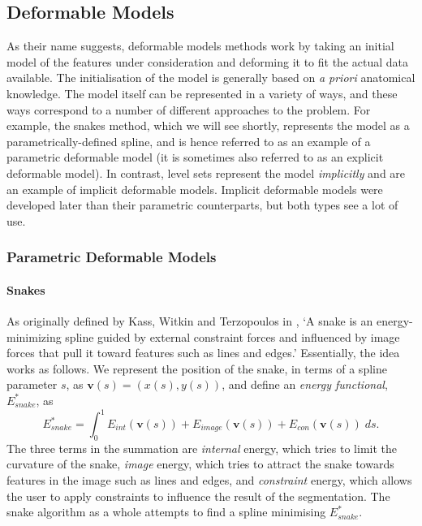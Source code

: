 \subsection{Deformable Models}

As their name suggests, deformable models methods work by taking an initial model of the features under consideration and deforming it to fit the actual data available. The initialisation of the model is generally based on \emph{a priori} anatomical knowledge. The model itself can be represented in a variety of ways, and these ways correspond to a number of different approaches to the problem. For example, the snakes method, which we will see shortly, represents the model as a parametrically-defined spline, and is hence referred to as an example of a parametric deformable model (it is sometimes also referred to as an explicit deformable model). In contrast, level sets represent the model \emph{implicitly} and are an example of implicit deformable models. Implicit deformable models were developed later than their parametric counterparts, but both types see a lot of use.

\subsubsection{Parametric Deformable Models}

\paragraph{Snakes}

As originally defined by Kass, Witkin and Terzopoulos in \cite{kass88}, `A snake is an energy-minimizing spline guided by external constraint forces and influenced by image forces that pull it toward features such as lines and edges.' Essentially, the idea works as follows. We represent the position of the snake, in terms of a spline parameter $s$, as $\mathbf{v}(s) = (x(s),y(s))$, and define an \emph{energy functional}, $E_{snake}^*$, as
%
\[
E_{snake}^* = \int_0^1 E_{int}(\mathbf{v}(s)) + E_{image}(\mathbf{v}(s)) + E_{con}(\mathbf{v}(s)) \; ds.
\]
%
The three terms in the summation are \emph{internal} energy, which tries to limit the curvature of the snake, \emph{image} energy, which tries to attract the snake towards features in the image such as lines and edges, and \emph{constraint} energy, which allows the user to apply constraints to influence the result of the segmentation. The snake algorithm as a whole attempts to find a spline minimising $E_{snake}^*$.

